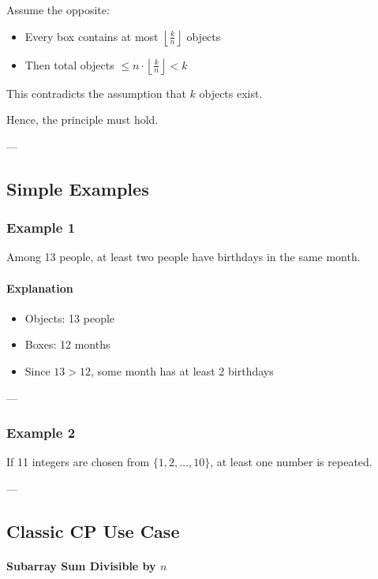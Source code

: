 \documentclass[11pt]{article}
\begin{document}
Assume the opposite:
\begin{itemize}
    \item Every box contains at most $\left\lfloor \frac{k}{n} \right\rfloor$ objects
    \item Then total objects $\le n \cdot \left\lfloor \frac{k}{n} \right\rfloor < k$
\end{itemize}

This contradicts the assumption that $k$ objects exist.

Hence, the principle must hold.

---

\subsection{Simple Examples}

\subsubsection{Example 1}
Among 13 people, at least two people have birthdays in the same month.

\paragraph{Explanation}
\begin{itemize}
    \item Objects: 13 people
    \item Boxes: 12 months
    \item Since $13 > 12$, some month has at least 2 birthdays
\end{itemize}

---

\subsubsection{Example 2}
If 11 integers are chosen from $\{1,2,\dots,10\}$, at least one number is repeated.

---

\subsection{Classic CP Use Case}

\paragraph{Subarray Sum Divisible by $n$}
\end{document}
